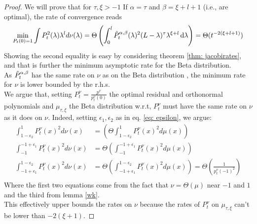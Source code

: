 \documentclass{article}
\begin{document}
\jacoptimal*
\begin{proof}
We will prove that for $\tau,\xi>-1$ If $\alpha = \tau$ and $\beta = \xi+l+1$ (i.e., are optimal), the rate of convergence reads
\begin{equation}
    \min_{P_t(0)=1}\int P_t^2(\lambda)\lambda^ld\nu(\lambda)=\Theta\left( \int_{0}^l  \Tilde{P}_t^{\alpha,\beta}(\lambda)^2(L-\lambda)^\tau\lambda^{\xi+l}\mathop{}\!\mathrm{d} \lambda\right) =\Theta( t^{-2(\xi+l+1)})
\end{equation}
Showing the second equality is easy by considering theorem \ref{thm: jacobirates}, and that is further the minimum asymptotic rate for the Beta distribution. \\
As $\Tilde{P}^{\alpha,\beta}_t$ has the same rate on $\nu$ as  on the Beta distribution , the minimum rate for $\nu$ is lower bounded by the r.h.s. \\
We argue that, setting $P^\nu_t=\frac{p^\nu}{p^\nu_t(0)}$ the optimal residual and orthonormal polynomials and $\mu_{\tau,\xi}$ the Beta distribution  w.r.t, $P^\nu_t$ must have the same rate on $\nu$ as it does on $\nu$. Indeed, setting $\epsilon_1,\epsilon_2$ as in eq. \ref{eq: epsilon}, we argue:
\begin{align}
    \int_{1-\epsilon_2}^{1}P_t^\nu(x)^2d\nu(x)&=\left(\Theta\int_{1-\epsilon_2}^{1}P_t^\nu(x)^2d\mu(x)\right)\\
    \int_{-1}^{-1+\epsilon_1}P_t^\nu(x)^2d\nu(x)&=\Theta\left(\int_{-1}^{-1+\epsilon_1}P_t^\nu(x)^2d\mu(x)\right)\\
    \int_{-1+\epsilon_1}^{1-\epsilon_2}P_t^\nu(x)^2d\nu(x)&=\Theta\left(\int_{-1+\epsilon_1}^{1-\epsilon_2}P_t^\nu(x)^2d\mu(x)\right)=\Theta\left(\frac{1}{p_t^\nu(-1)^2}\right)\\
\end{align}
Where the first two equations come from the fact that $\nu=\Theta(\mu)$ near $-1$ and $1$ and the third from lemma \ref{wk}.\\
This effectively upper bounds the rates on $\nu$ because the rates of $P_t^\nu$ on $\mu_{\tau,\xi}$ can't be lower than $-2(\xi+1)$.
\end{proof}
\end{document}
